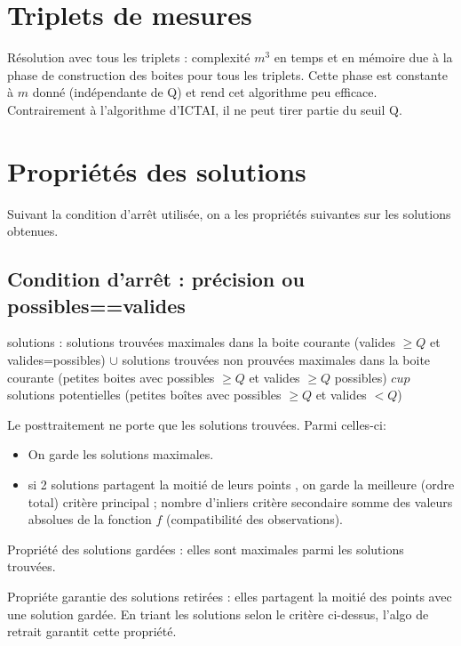 \documentclass{article}
\begin{document}
\section {Triplets de mesures}

    R\'esolution avec tous les triplets :  complexit\'e $m^3$ en temps et en m\'emoire 
due \`a la phase de construction des boites pour tous les triplets.  
    Cette phase est constante \`a $m$ donn\'e (ind\'ependante de Q) et rend cet algorithme peu efficace.
    Contrairement \`a l'algorithme d'ICTAI, il ne peut tirer partie du seuil Q.

    


    
\section  {Propri\'et\'es des solutions}

Suivant la condition d'arr\^et utilis\'ee, on a les propri\'et\'es suivantes sur les solutions obtenues.


\subsection {Condition d'arr\^et : pr\'ecision ou possibles==valides}
       solutions : solutions trouv\'ees maximales dans la boite courante (valides $\geq Q$ et valides=possibles) 
       $\cup$  solutions trouv\'ees  non prouv\'ees maximales dans la boite courante (petites boites avec possibles $\geq Q$ et valides $\geq Q$  possibles)
       $cup$  solutions potentielles (petites bo\^ites avec  possibles $\geq Q$  et valides $< Q$)


       Le posttraitement ne porte que les solutions trouv\'ees. Parmi celles-ci:
\begin{itemize}
\item{ On garde les solutions maximales}.

\item si 2 solutions partagent la moiti\'e de leurs points , on  garde la meilleure  (ordre total)
             crit\`ere principal ; nombre d'inliers 
             crit\`ere secondaire somme des valeurs absolues de la fonction $f$ (compatibilit\'e des observations).
       
\end{itemize}
Propri\'et\'e des solutions gard\'ees : elles sont maximales parmi les solutions trouv\'ees.

Propri\'ete garantie des solutions retir\'ees : elles  partagent la moiti\'e des points avec une solution gard\'ee.
En triant les solutions selon le crit\`ere ci-dessus, l'algo de retrait garantit cette propri\'et\'e.
\end{document}
